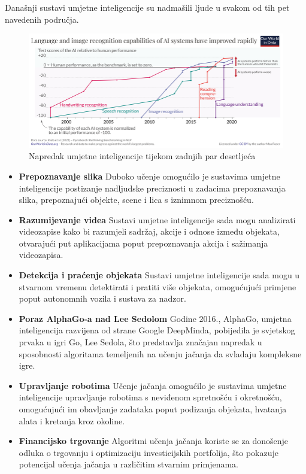 \documentclass[diplomskirad]{fer}
\begin{document}
Današnji sustavi umjetne inteligencije su nadmašili ljude u svakom od tih pet navedenih područja.\cite{owid-brief-history-of-ai}
\begin{figure}[htb]
  \centering
  \includegraphics[width=1\linewidth]{Figures/AI performance history.png} 
  \caption{Napredak umjetne inteligencije tijekom zadnjih par desetljeća}
  \label{slk:AI_advances}
\end{figure}
\begin{itemize}
    \item \textbf{Prepoznavanje slika} Duboko učenje omogućilo je sustavima umjetne inteligencije postizanje nadljudske preciznosti u zadacima prepoznavanja slika, prepoznajući objekte, scene i lica s iznimnom preciznošću.

    \item \textbf{Razumijevanje videa} Sustavi umjetne inteligencije sada mogu analizirati videozapise kako bi razumjeli sadržaj, akcije i odnose između objekata, otvarajući put aplikacijama poput prepoznavanja akcija i sažimanja videozapisa.
    \item \textbf{Detekcija i praćenje objekata} Sustavi umjetne inteligencije sada mogu u stvarnom vremenu detektirati i pratiti više objekata, omogućujući primjene poput autonomnih vozila i sustava za nadzor.
    
    \item \textbf{Poraz AlphaGo-a nad Lee Sedolom} Godine 2016., AlphaGo, umjetna inteligencija razvijena od strane Google DeepMinda, pobijedila je svjetskog prvaka u igri Go, Lee Sedola, što predstavlja značajan napredak u sposobnosti algoritama temeljenih na učenju jačanja da svladaju kompleksne igre.

    \item \textbf{Upravljanje robotima} Učenje jačanja omogućilo je sustavima umjetne inteligencije upravljanje robotima s neviđenom spretnošću i okretnošću, omogućujući im obavljanje zadataka poput podizanja objekata, hvatanja alata i kretanja kroz okoline.

    \item \textbf{Financijsko trgovanje} Algoritmi učenja jačanja koriste se za donošenje odluka o trgovanju i optimizaciju investicijskih portfolija, što pokazuje potencijal učenja jačanja u različitim stvarnim primjenama.
\end{itemize}
\end{document}
